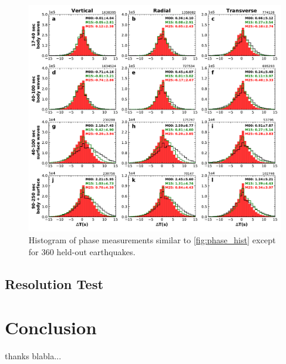 \documentclass[extra,mreferee]{gji}
\begin{document}
\begin{figure}
\includegraphics[width=\textwidth]{figures/dt_histogram_360.pdf}
  \caption{Histogram of phase measurements similar to \ref{fig:phase_hist} except for 360 held-out earthquakes.}
\centering
\end{figure}

\subsection{Resolution Test}


\section{Conclusion}


\begin{acknowledgments}
thanks blabla...
\end{acknowledgments}

\newpage


\end{document}
